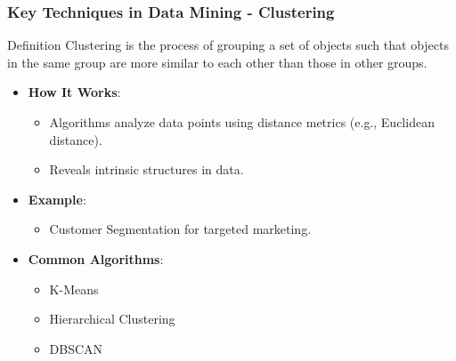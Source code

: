 \documentclass[aspectratio=169]{beamer}
\begin{document}
\begin{frame}[fragile]
    \frametitle{Key Techniques in Data Mining - Clustering}
    \begin{block}{Definition}
        Clustering is the process of grouping a set of objects such that objects in the same group are more similar to each other than those in other groups.
    \end{block}
    \begin{itemize}
        \item \textbf{How It Works}:
        \begin{itemize}
            \item Algorithms analyze data points using distance metrics (e.g., Euclidean distance).
            \item Reveals intrinsic structures in data.
        \end{itemize}
        \item \textbf{Example}:
            \begin{itemize}
                \item Customer Segmentation for targeted marketing.
            \end{itemize}
        \item \textbf{Common Algorithms}:
            \begin{itemize}
                \item K-Means
                \item Hierarchical Clustering
                \item DBSCAN
            \end{itemize}
    \end{itemize}
\end{frame}
\end{document}
